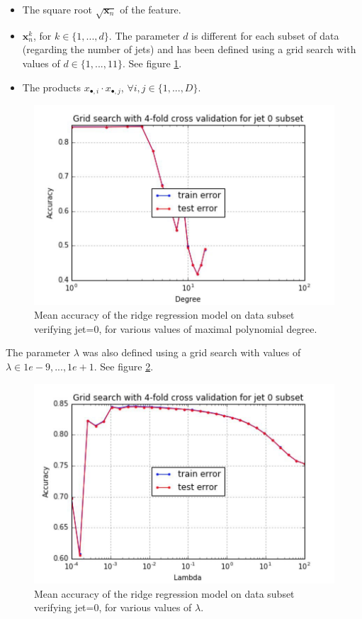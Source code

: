 \documentclass[10pt,conference,compsocconf]{IEEEtran}
\begin{document}
\begin{itemize}
\item The square root $\sqrt{\mathbf{x}_n}$ of the feature.
\item $\mathbf{x}_n^k$, for $k\in \{1, ..., d\}$. The parameter $d$ is different for each subset of data (regarding the number of jets) and has been defined using a grid search with values of $d \in \{1, ..., 11\}$. See figure \ref{jet_0_degress}.
\item The products $x_{\bullet,i}\cdot x_{\bullet,j}$, $\forall i,j \in \{1, ..., D\}$.
\end{itemize}

\begin{figure}[htp]
\centering
\includegraphics[scale=0.5]{grid_search_jet_0_degrees.png}
\caption{\label{jet_0_degress} Mean accuracy of the ridge regression model on data subset verifying jet=0, for various values of maximal polynomial degree.}
\end{figure}

The parameter $\lambda$ was also defined using a grid search with values of $\lambda \in {1e-9, ..., 1e+1}$. See figure \ref{jet_0_lambdas}.

\begin{figure}[htp]
\centering
\includegraphics[scale=0.5]{grid_search_jet_0_lambdas.png}
\caption{\label{jet_0_lambdas} Mean accuracy of the ridge regression model on data subset verifying jet=0, for various values of $\lambda$.}
\end{figure}
\end{document}
